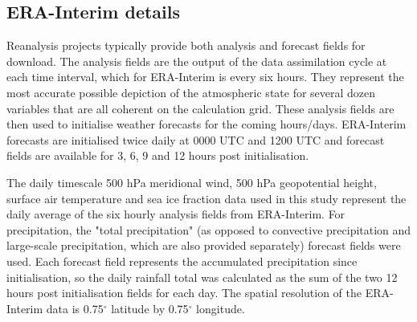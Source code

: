 \subsection{ERA-Interim details}

Reanalysis projects typically provide both analysis and forecast fields for download. The analysis fields are the output of the data assimilation cycle at each time interval, which for ERA-Interim is every six hours. They represent the most accurate possible depiction of the atmospheric state for several dozen variables that are all coherent on the calculation grid. These analysis fields are then used to initialise weather forecasts for the coming hours/days. ERA-Interim forecasts are initialised twice daily at 0000 UTC and 1200 UTC and forecast fields are available for 3, 6, 9 and 12 hours post initialisation.  

The daily timescale 500 hPa meridional wind, 500 hPa geopotential height, surface air temperature and sea ice fraction data used in this study represent the daily average of the six hourly analysis fields from ERA-Interim. For precipitation, the "total precipitation" (as opposed to convective precipitation and large-scale precipitation, which are also provided separately) forecast fields were used. Each forecast field represents the accumulated precipitation since initialisation, so the daily rainfall total was calculated as the sum of the two 12 hours post initialisation fields for each day. The spatial resolution of the ERA-Interim data is 0.75$^{\circ}$ latitude by 0.75$^{\circ}$ longitude.   
